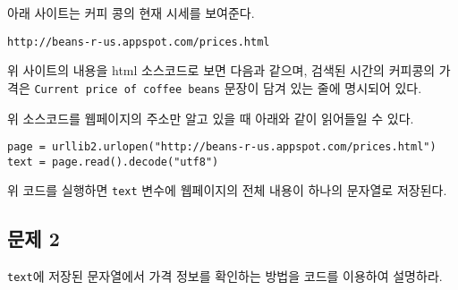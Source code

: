\documentclass[11pt]{article}
\newenvironment{Shaded}{}{}
\newcommand{\KeywordTok}[1]{\textcolor[rgb]{0.00,0.44,0.13}{\textbf{{#1}}}}
\newcommand{\StringTok}[1]{\textcolor[rgb]{0.25,0.44,0.63}{{#1}}}
\newcommand{\OtherTok}[1]{\textcolor[rgb]{0.00,0.44,0.13}{{#1}}}
\newcommand{\NormalTok}[1]{{#1}}
\begin{document}
아래 사이트는 커피 콩의 현재 시세를 보여준다.

\begin{verbatim}
http://beans-r-us.appspot.com/prices.html
\end{verbatim}

위 사이트의 내용을 html 소스코드로 보면 다음과 같으며, 검색된 시간의
커피콩의 가격은 \texttt{Current\ price\ of\ coffee\ beans} 문장이 담겨
있는 줄에 명시되어 있다.

\begin{Shaded}
\end{Shaded}

위 소스코드를 웹페이지의 주소만 알고 있을 때 아래와 같이 읽어들일 수 있다.

\begin{verbatim}
page = urllib2.urlopen("http://beans-r-us.appspot.com/prices.html")
text = page.read().decode("utf8")
\end{verbatim}

위 코드를 실행하면 \verb|text| 변수에 웹페이지의 전체 내용이 하나의 문자열로 저장된다.

\subsection*{문제 2}\label{uxbb38uxc81c}

\verb|text|에 저장된 문자열에서 가격 정보를 확인하는 방법을 코드를 이용하여 설명하라.


\begin{verbatim}





\end{verbatim}

\iffalse
견본답안:

\begin{Verbatim}
price_index = text.find(">$") + 2
bean_price_str = text[price_index : price_index + 4]
bean_price = float(bean_price_str)
\end{Verbatim}
\fi
\end{document}
